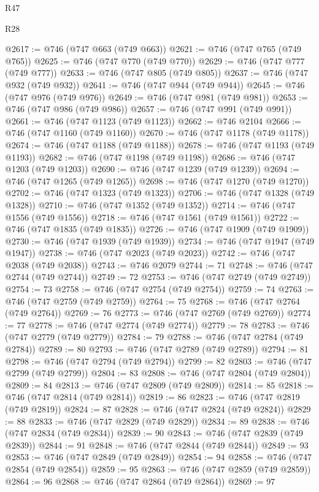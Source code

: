 \begin{lexlean}{R47}
\begin{lexlean}{R28}
\begin{coremodule}
{{{{{{{{{{{{{{{{{{{{{{{{{{{{{{{{{{{{{{{{{{{{{{{{{{{{{{{{{{{{{{{{{{{{{{{{{{{{{{{{{{{{{{{{{{{{{{{{{{{{{{{{{{{{{{{{{{{{{{{{{{{{{{{{{{{{{@2617 := @746 (@747 @663 (@749 @663))
@2621 := @746 (@747 @765 (@749 @765))
@2625 := @746 (@747 @770 (@749 @770))
@2629 := @746 (@747 @777 (@749 @777))
@2633 := @746 (@747 @805 (@749 @805))
@2637 := @746 (@747 @932 (@749 @932))
@2641 := @746 (@747 @944 (@749 @944))
@2645 := @746 (@747 @976 (@749 @976))
@2649 := @746 (@747 @981 (@749 @981))
@2653 := @746 (@747 @986 (@749 @986))
@2657 := @746 (@747 @991 (@749 @991))
@2661 := @746 (@747 @1123 (@749 @1123))
@2662 := @746 @2104
@2666 := @746 (@747 @1160 (@749 @1160))
@2670 := @746 (@747 @1178 (@749 @1178))
@2674 := @746 (@747 @1188 (@749 @1188))
@2678 := @746 (@747 @1193 (@749 @1193))
@2682 := @746 (@747 @1198 (@749 @1198))
@2686 := @746 (@747 @1203 (@749 @1203))
@2690 := @746 (@747 @1239 (@749 @1239))
@2694 := @746 (@747 @1265 (@749 @1265))
@2698 := @746 (@747 @1270 (@749 @1270))
@2702 := @746 (@747 @1323 (@749 @1323))
@2706 := @746 (@747 @1328 (@749 @1328))
@2710 := @746 (@747 @1352 (@749 @1352))
@2714 := @746 (@747 @1556 (@749 @1556))
@2718 := @746 (@747 @1561 (@749 @1561))
@2722 := @746 (@747 @1835 (@749 @1835))
@2726 := @746 (@747 @1909 (@749 @1909))
@2730 := @746 (@747 @1939 (@749 @1939))
@2734 := @746 (@747 @1947 (@749 @1947))
@2738 := @746 (@747 @2023 (@749 @2023))
@2742 := @746 (@747 @2038 (@749 @2038))
@2743 := @746 @2079
@2744 := 71
@2748 := @746 (@747 @2744 (@749 @2744))
@2749 := 72
@2753 := @746 (@747 @2749 (@749 @2749))
@2754 := 73
@2758 := @746 (@747 @2754 (@749 @2754))
@2759 := 74
@2763 := @746 (@747 @2759 (@749 @2759))
@2764 := 75
@2768 := @746 (@747 @2764 (@749 @2764))
@2769 := 76
@2773 := @746 (@747 @2769 (@749 @2769))
@2774 := 77
@2778 := @746 (@747 @2774 (@749 @2774))
@2779 := 78
@2783 := @746 (@747 @2779 (@749 @2779))
@2784 := 79
@2788 := @746 (@747 @2784 (@749 @2784))
@2789 := 80
@2793 := @746 (@747 @2789 (@749 @2789))
@2794 := 81
@2798 := @746 (@747 @2794 (@749 @2794))
@2799 := 82
@2803 := @746 (@747 @2799 (@749 @2799))
@2804 := 83
@2808 := @746 (@747 @2804 (@749 @2804))
@2809 := 84
@2813 := @746 (@747 @2809 (@749 @2809))
@2814 := 85
@2818 := @746 (@747 @2814 (@749 @2814))
@2819 := 86
@2823 := @746 (@747 @2819 (@749 @2819))
@2824 := 87
@2828 := @746 (@747 @2824 (@749 @2824))
@2829 := 88
@2833 := @746 (@747 @2829 (@749 @2829))
@2834 := 89
@2838 := @746 (@747 @2834 (@749 @2834))
@2839 := 90
@2843 := @746 (@747 @2839 (@749 @2839))
@2844 := 91
@2848 := @746 (@747 @2844 (@749 @2844))
@2849 := 93
@2853 := @746 (@747 @2849 (@749 @2849))
@2854 := 94
@2858 := @746 (@747 @2854 (@749 @2854))
@2859 := 95
@2863 := @746 (@747 @2859 (@749 @2859))
@2864 := 96
@2868 := @746 (@747 @2864 (@749 @2864))
@2869 := 97
}}}}}}}}}}}}}}}}}}}}}}}}}}}}}}}}}}}}}}}}}}}}}}}}}}}}}}}}}}}}}}}}}}}}}}}}}}}}}}}}}}}}}}}}}}}}}}}}}}}}}}}}}}}}}}}}}}}}}}}}}}}}}}}}}}}}}
\end{coremodule}
\end{lexlean}
\end{lexlean}
